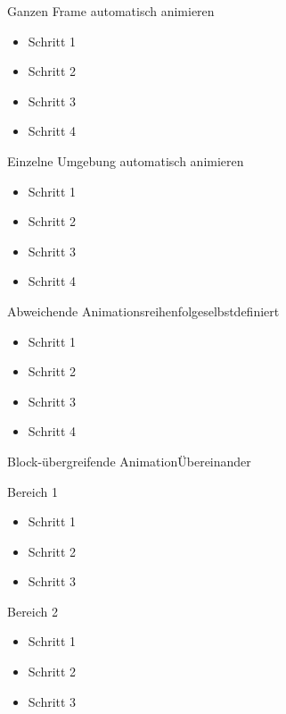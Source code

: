 \documentclass[t,aspectratio=169,dvipsnames]{beamer}
\begin{document}
\begin{frame}[<+->]{Ganzen Frame automatisch animieren}
\begin{itemize}
	\item Schritt 1
	\item Schritt 2
	\item Schritt 3
	\item Schritt 4
\end{itemize}
\end{frame}

\begin{frame}{Einzelne Umgebung automatisch animieren}
\begin{itemize}[<+->]
	\item Schritt 1
	\item Schritt 2
	\item Schritt 3
	\item Schritt 4
\end{itemize}
\end{frame}

\begin{frame}{Abweichende Animationsreihenfolge}{selbstdefiniert}
\begin{itemize}
	\item<1,3> Schritt 1
	\item<2-> Schritt 2
	\item<3-4> Schritt 3
	\item<5> Schritt 4
\end{itemize}
\end{frame}

\begin{frame}{Block-übergreifende Animation}{Übereinander}
\begin{block}{Bereich 1}
	\begin{itemize}
		\item<1-> Schritt 1
		\item<3-> Schritt 2
		\item<5-> Schritt 3
	\end{itemize}
\end{block}
\begin{block}{Bereich 2}
	\begin{itemize}
		\item<2-> Schritt 1
		\item<4-> Schritt 2
		\item<6-> Schritt 3
	\end{itemize}
\end{block}
\end{frame}
\end{document}
